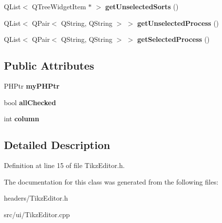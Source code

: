 \begin{DoxyCompactItemize}
\item 
\hypertarget{classTikzEditor_a12f0713591de9d2b960339ffa8f3a5f2}{Q\+List$<$ Q\+Tree\+Widget\+Item $\ast$ $>$ {\bfseries get\+Unselected\+Sorts} ()}\label{classTikzEditor_a12f0713591de9d2b960339ffa8f3a5f2}

\item 
\hypertarget{classTikzEditor_a1ec3d22d3321a3e515a5a633509858d3}{Q\+List$<$ Q\+Pair$<$ Q\+String, Q\+String $>$ $>$ {\bfseries get\+Unselected\+Process} ()}\label{classTikzEditor_a1ec3d22d3321a3e515a5a633509858d3}

\item 
\hypertarget{classTikzEditor_a4954412c879b69099abffb5e846c5af1}{Q\+List$<$ Q\+Pair$<$ Q\+String, Q\+String $>$ $>$ {\bfseries get\+Selected\+Process} ()}\label{classTikzEditor_a4954412c879b69099abffb5e846c5af1}

\end{DoxyCompactItemize}
\subsection*{Public Attributes}
\begin{DoxyCompactItemize}
\item 
\hypertarget{classTikzEditor_a16c63b4dfc9a20d37a6475d6590659d3}{P\+H\+Ptr {\bfseries my\+P\+H\+Ptr}}\label{classTikzEditor_a16c63b4dfc9a20d37a6475d6590659d3}

\item 
\hypertarget{classTikzEditor_ad5ce4360045044c855cf203459946eef}{bool {\bfseries all\+Checked}}\label{classTikzEditor_ad5ce4360045044c855cf203459946eef}

\item 
\hypertarget{classTikzEditor_a20010fe0db81fe1320f30e94b7ac8c34}{int {\bfseries column}}\label{classTikzEditor_a20010fe0db81fe1320f30e94b7ac8c34}

\end{DoxyCompactItemize}


\subsection{Detailed Description}


Definition at line 15 of file Tikz\+Editor.\+h.



The documentation for this class was generated from the following files\+:\begin{DoxyCompactItemize}
\item 
headers/Tikz\+Editor.\+h\item 
src/ui/Tikz\+Editor.\+cpp\end{DoxyCompactItemize}
